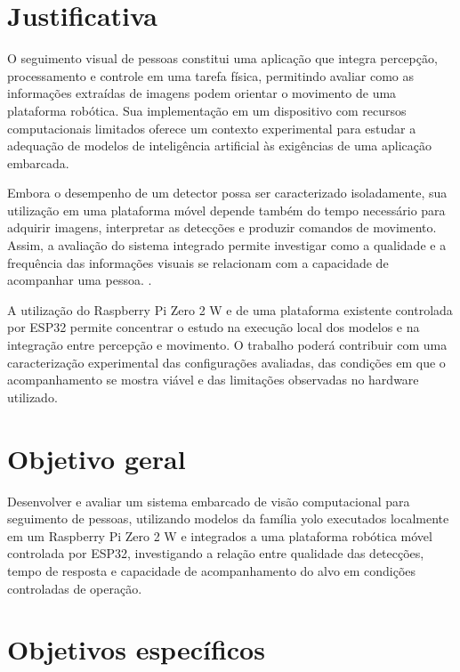 \section{Justificativa}

O seguimento visual de pessoas constitui uma aplicação que integra percepção, processamento e controle em uma tarefa física, permitindo avaliar como as informações extraídas de imagens podem orientar o movimento de uma plataforma robótica. Sua implementação em um dispositivo com recursos computacionais limitados oferece um contexto experimental para estudar a adequação de modelos de inteligência artificial às exigências de uma aplicação embarcada.

Embora o desempenho de um detector possa ser caracterizado isoladamente, sua utilização em uma plataforma móvel depende também do tempo necessário para adquirir imagens, interpretar as detecções e produzir comandos de movimento. Assim, a avaliação do sistema integrado permite investigar como a qualidade e a frequência das informações visuais se relacionam com a capacidade de acompanhar uma pessoa. .

A utilização do Raspberry Pi Zero 2 W e de uma plataforma existente controlada por ESP32 permite concentrar o estudo na execução local dos modelos e na integração entre percepção e movimento. O trabalho poderá contribuir com uma caracterização experimental das configurações avaliadas, das condições em que o acompanhamento se mostra viável e das limitações observadas no hardware utilizado.

\section{Objetivo geral}

Desenvolver e avaliar um sistema embarcado de visão computacional para seguimento de pessoas, utilizando modelos da família \gls{yolo} executados localmente em um Raspberry Pi Zero 2 W e integrados a uma plataforma robótica móvel controlada por ESP32, investigando a relação entre qualidade das detecções, tempo de resposta e capacidade de acompanhamento do alvo em condições controladas de operação.

\section{Objetivos específicos}

